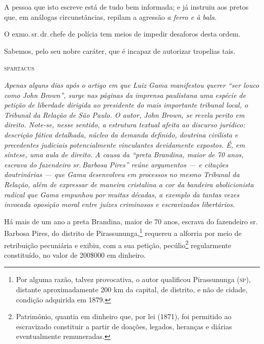 A pessoa que isto escreve está de tudo bem informada; e já instruiu aos
pretos que, em análogas circunstâncias, repilam a agressão \emph{a ferro
e à bala}.

O exmo.\,sr.\,dr.\,chefe de polícia tem meios de impedir desaforos desta
ordem.

Sabemos, pelo seu nobre caráter, que é incapaz de autorizar tropelias
tais.\medskip

\hfill\textsc{spartacus}


\begin{resumo}
\emph{Apenas alguns dias após o artigo em que Luiz Gama manifestou
querer ``ser louco como John Brown'', surge nas páginas da imprensa
paulistana uma espécie de petição de liberdade dirigida ao presidente do
mais importante tribunal local, o Tribunal da Relação de São Paulo. O
autor, John Brown, se revela perito em direito. Note-se, nesse
sentido, a estrutura textual afeita ao discurso jurídico: descrição
fática detalhada, núcleo da demanda definido, doutrina civilista e
precedentes judiciais potencialmente vinculantes devidamente expostos.
É, em síntese, uma aula de direito. A causa da ``preta Brandina, maior de
70 anos, escrava do fazendeiro sr.\,Barbosa Pires'' reúne argumentos --- e
citações doutrinárias --- que Gama desenvolveu em processos no mesmo
Tribunal da Relação, além de expressar de maneira cristalina a cor da
bandeira abolicionista radical que Gama empunhou por muitas décadas, a
exemplo da tantas vezes invocada oposição moral entre juízes criminosos
e escravizados libertários. }
\end{resumo}


Há mais de um ano a preta Brandina, maior de 70 anos, escrava do fazendeiro sr.\,Barbosa Pires, do distrito de Pirassununga,\footnote{
  Por alguma razão, talvez provocativa, o autor qualificou Pirassununga
  (\textsc{sp}), distante aproximadamente 200 km da capital, de distrito, e não
  de cidade, condição adquirida em 1879.} requereu a alforria por meio
de retribuição pecuniária e exibiu, com a sua petição, pecúlio\footnote{
  Patrimônio, quantia em dinheiro que, por lei (1871), foi permitido ao \label{peculio}
  escravizado constituir a partir de doações, legados, heranças e
  diárias eventualmente remuneradas.} regularmente constituído, no valor
de 200\$000 em dinheiro.

